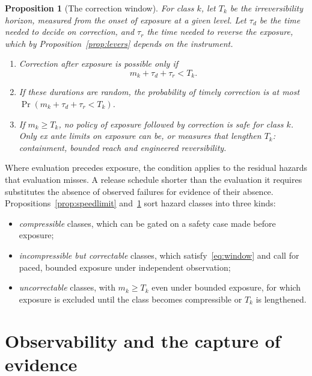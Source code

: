 \documentclass[11pt]{article}
\theoremstyle{plain}
\newtheorem{proposition}{Proposition}
\theoremstyle{definition}
\begin{document}
\begin{proposition}[The correction window]\label{prop:window}
For class $k$, let $T_k$ be the irreversibility horizon, measured from the onset of exposure at a given level. Let $\tau_d$ be the time needed to decide on correction, and $\tau_r$ the time needed to reverse the exposure, which by Proposition~\ref{prop:levers} depends on the instrument.
\begin{enumerate}[label=(\roman*),leftmargin=*]
\item Correction after exposure is possible only if
\begin{equation}\label{eq:window}
m_k+\tau_d+\tau_r<T_k .
\end{equation}
\item If these durations are random, the probability of timely correction is at most $\Pr(m_k+\tau_d+\tau_r<T_k)$.
\item If $m_k\ge T_k$, no policy of exposure followed by correction is safe for class $k$. Only ex ante limits on exposure can be, or measures that lengthen $T_k$: containment, bounded reach and engineered reversibility.
\end{enumerate}
\end{proposition}

Where evaluation precedes exposure, the condition applies to the residual hazards that evaluation misses. A release schedule shorter than the evaluation it requires substitutes the absence of observed failures for evidence of their absence. Propositions~\ref{prop:speedlimit} and~\ref{prop:window} sort hazard classes into three kinds:
\begin{itemize}[leftmargin=*]
\item \emph{compressible} classes, which can be gated on a safety case made before exposure;
\item \emph{incompressible but correctable} classes, which satisfy~\eqref{eq:window} and call for paced, bounded exposure under independent observation;
\item \emph{uncorrectable} classes, with $m_k\ge T_k$ even under bounded exposure, for which exposure is excluded until the class becomes compressible or $T_k$ is lengthened.
\end{itemize}

\section{Observability and the capture of evidence}\label{sec:observability}
\end{document}
